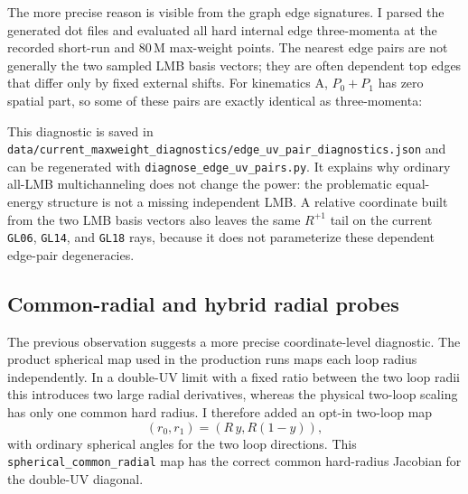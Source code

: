 \documentclass[11pt]{article}
\begin{document}
The more precise reason is visible from the graph edge signatures.  I parsed
the generated dot files and evaluated all hard internal edge three-momenta at
the recorded short-run and \(80\,\mathrm{M}\) max-weight points.  The nearest
edge pairs are not generally the two sampled LMB basis vectors; they are often
dependent top edges that differ only by fixed external shifts.  For kinematics
A, \(P_0+P_1\) has zero spatial part, so some of these pairs are exactly
identical as three-momenta:
\begin{center}
\scriptsize
{}
\end{center}
This diagnostic is saved in
\texttt{data/current\_maxweight\_diagnostics/edge\_uv\_pair\_diagnostics.json}
and can be regenerated with
\texttt{diagnose\_edge\_uv\_pairs.py}.  It explains why ordinary all-LMB
multichanneling does not change the power: the problematic equal-energy
structure is not a missing independent LMB.  A relative coordinate built from
the two LMB basis vectors also leaves the same \(R^{+1}\) tail on the current
\texttt{GL06}, \texttt{GL14}, and \texttt{GL18} rays, because it does not
parameterize these dependent edge-pair degeneracies.

\subsection{Common-radial and hybrid radial probes}

The previous observation suggests a more precise coordinate-level diagnostic.
The product spherical map used in the production runs maps each loop radius
independently.  In a double-UV limit with a fixed ratio between the two loop
radii this introduces two large radial derivatives, whereas the physical
two-loop scaling has only one common hard radius.  I therefore added an
opt-in two-loop map
\[
  (r_0,r_1)=(R\,y,R(1-y)),
\]
with ordinary spherical angles for the two loop directions.  This
\texttt{spherical\_common\_radial} map has the correct common hard-radius
Jacobian for the double-UV diagonal.
\end{document}
